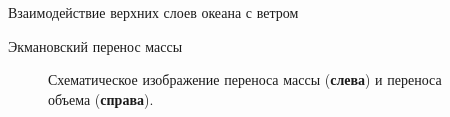 \begin{chapter}{Взаимодействие верхних слоев океана с ветром}
\begin{section}{Экмановский перенос массы}
\begin{figure}[h!]
\caption{Схематическое изображение переноса 
массы (\textbf{слева})
и переноса объема  (\textbf{справа}).}
\label{fig:transportsketch}
\end{figure}
%


\end{section}
\end{chapter}
